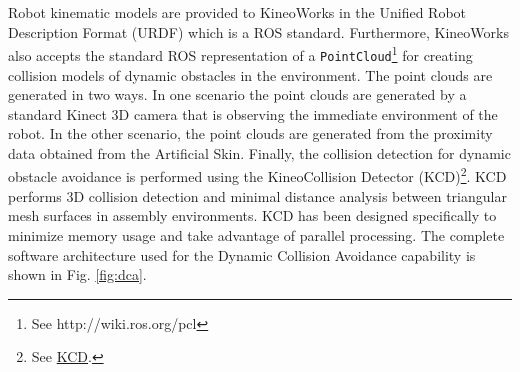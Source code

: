 Robot kinematic models are provided to KineoWorks in the Unified Robot Description Format (URDF) which is a ROS standard. Furthermore, KineoWorks also accepts the standard ROS representation of a \texttt{PointCloud}\footnote{See http://wiki.ros.org/pcl} for creating collision models of dynamic obstacles in the environment. The point clouds are generated in two ways. In one scenario the point clouds are generated by a standard Kinect 3D camera that is observing the immediate environment of the robot. In the other scenario, the point clouds are generated from the proximity data obtained from the Artificial Skin. Finally, the collision detection for dynamic obstacle avoidance is performed using the Kineo\texttrademark Collision Detector (KCD)\footnote{See \href{http://www.plm.automation.siemens.com/en\_us/products/open/kineo/collision-detector/index.shtml}{KCD}.}. KCD performs 3D collision detection and minimal distance analysis between triangular mesh surfaces in assembly environments. KCD has been designed specifically to minimize memory usage and take advantage of parallel processing. The complete software architecture used for the Dynamic Collision Avoidance capability is shown in Fig. \ref{fig:dca}.

